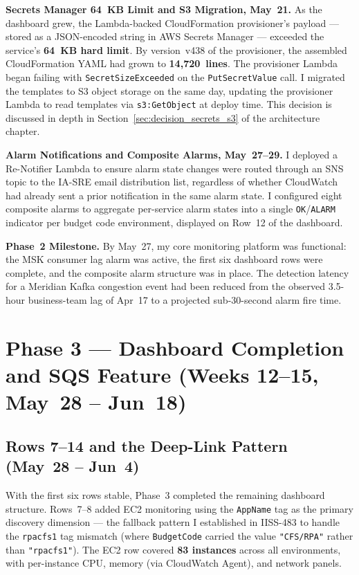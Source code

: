 \textbf{Secrets Manager 64~KB Limit and S3 Migration, May~21.}
As the dashboard grew, the Lambda-backed CloudFormation provisioner's payload
--- stored as a JSON-encoded string in AWS Secrets Manager --- exceeded the
service's \textbf{64~KB hard limit}. By version~v438 of the provisioner, the
assembled CloudFormation YAML had grown to \textbf{14,720~lines}. The provisioner
Lambda began failing with \texttt{SecretSizeExceeded} on the
\texttt{PutSecretValue} call. I migrated the templates to S3 object storage
on the same day, updating the provisioner Lambda to read templates via
\texttt{s3:GetObject} at deploy time. This decision is discussed in depth in
Section~\ref{sec:decision_secrets_s3} of the architecture chapter.

\textbf{Alarm Notifications and Composite Alarms, May~27--29.}
I deployed a Re-Notifier Lambda to ensure alarm state changes were routed
through an SNS topic to the IA-SRE email distribution list, regardless of
whether CloudWatch had already sent a prior notification in the same alarm
state. I configured eight composite alarms to aggregate per-service alarm
states into a single \texttt{OK}/\texttt{ALARM} indicator per budget code
environment, displayed on Row~12 of the dashboard.

\textbf{Phase~2 Milestone.} By May~27, my core monitoring platform was
functional: the MSK consumer lag alarm was active, the first six dashboard rows
were complete, and the composite alarm structure was in place. The detection
latency for a Meridian Kafka congestion event had been reduced from the observed
3.5-hour business-team lag of Apr~17 to a projected sub-30-second alarm fire
time.

\section{Phase 3 --- Dashboard Completion and SQS Feature (Weeks 12--15, May~28 -- Jun~18)}
\label{sec:phase3_completion}

\subsection{Rows 7--14 and the Deep-Link Pattern (May~28 -- Jun~4)}

With the first six rows stable, Phase~3 completed the remaining dashboard structure.
Rows~7--8 added EC2 monitoring using the \texttt{AppName} tag as the primary
discovery dimension --- the fallback pattern I established in IISS-483 to handle
the \texttt{rpacfs1} tag mismatch (where \texttt{BudgetCode} carried the value
\texttt{"CFS/RPA"} rather than \texttt{"rpacfs1"}). The EC2 row covered
\textbf{83 instances} across all environments, with per-instance CPU, memory
(via CloudWatch Agent), and network panels.

